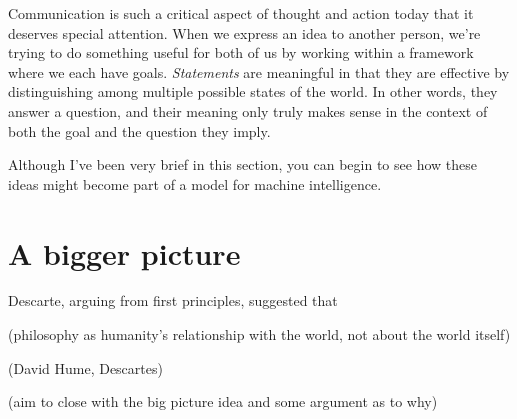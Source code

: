\documentclass[20pt,]{extarticle}
\begin{document}
Communication is such a critical aspect of thought and action today that
it deserves special attention. When we express an idea to another
person, we're trying to do something useful for both of us by working
within a framework where we each have goals. \emph{Statements} are
meaningful in that they are effective by distinguishing among multiple
possible states of the world. In other words, they answer a question,
and their meaning only truly makes sense in the context of both the goal
and the question they imply.

Although I've been very brief in this section, you can begin to see how
these ideas might become part of a model for machine intelligence.

\section{A bigger picture}\label{a-bigger-picture}

Descarte, arguing from first principles, suggested that

(philosophy as humanity's relationship with the world, not about the
world itself)

(David Hume, Descartes)

(aim to close with the big picture idea and some argument as to why)
\end{document}
